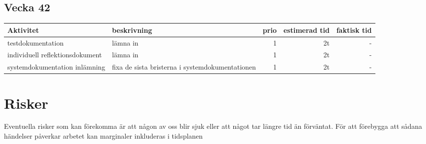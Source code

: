 \documentclass{TDP003mall}
\begin{document}
\subsection{Vecka 42}

\begin{table}[!h]
  \begin{tabularx}{\linewidth}{|l|X|r|r|r|}
\hline

Aktivitet & beskrivning & prio & estimerad tid & faktisk tid \\\hline
testdokumentation & lämna in & 1 & 2t & -\\\hline
individuell reflektionsdokument & lämna in & 1 & 2t & -\\\hline
systemdokumentation inlämning & fixa de sista bristerna i systemdokumentationen & 1 & 2t & -\\\hline

\end{tabularx}
\end{table}

\section{Risker}
Eventuella risker som kan förekomma är att någon av oss blir sjuk eller att något tar längre tid än förväntat. För att förebygga att sådana händelser påverkar arbetet kan marginaler inkluderas i tidsplanen
\end{document}

